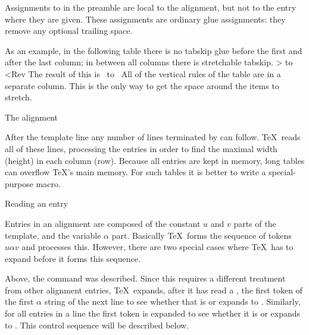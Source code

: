 Assignments to  in the preamble are local to the
alignment, but not to the entry where they are given.
These assignments are ordinary glue assignments:
they remove any optional trailing space.

As an example, in the following table there is no tabskip
glue before the first and after the last column; 
in between all columns there is stretchable tabskip.
\Ver>\tabskip=0pt \halign to <Rev
The result of this is
\disp\PopListLevel
\leavevmode{}%
\hbox{ 
 \vbox{\offinterlineskip
\tabskip=0pt \halign to }}\dispstop
All of the vertical rules
of the table are in a separate column. This is the only way
to get the space around the items to stretch.

\point The alignment

After the template line any number of lines terminated by 
can follow. \TeX\ reads all of these lines, processing the
entries in order to find the maximal width (height) in 
each column (row).
Because all entries are kept in memory,
long tables can overflow \TeX's main memory.
For such tables it is better to write a special-purpose macro.

\spoint Reading an entry

Entries in an alignment are composed of the 
constant $u$ and $v$ parts
of the template, and the variable $\alpha$ part.
Basically \TeX\ forms the sequence of tokens $u\alpha v$
and processes this. However, there are two special cases
where \TeX\ has to expand before it forms this sequence.

Above, the  command was described. 
Since this requires a different treatment from other
alignment entries, 
\TeX\ expands, after it has read a ,
the first token of the first $\alpha$ string
of the next line to
see whether that is or expands to .
Similarly, for all entries
in a line the first token is expanded to see
whether it is or expands to . This control sequence
will be described below.

